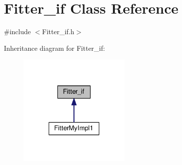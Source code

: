 \hypertarget{class_fitter__if}{\section{Fitter\-\_\-if Class Reference}
\label{class_fitter__if}
}


{\ttfamily \#include $<$Fitter\-\_\-if.\-h$>$}



Inheritance diagram for Fitter\-\_\-if\-:
\nopagebreak
\begin{figure}[H]
\begin{center}
\leavevmode
\includegraphics[width=156pt]{class_fitter__if__inherit__graph}
\end{center}
\end{figure}

